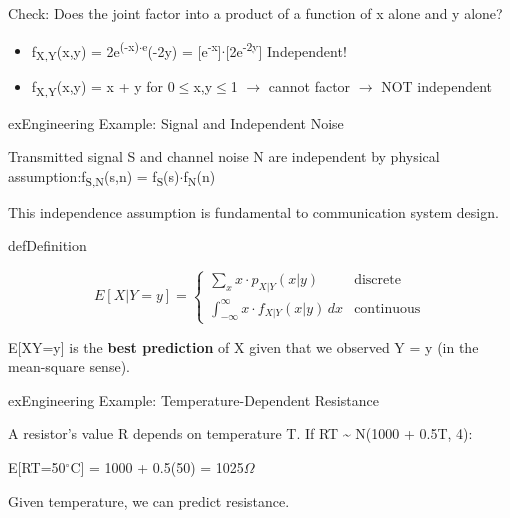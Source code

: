 
Check: Does the joint factor into a product of a function of x alone and y alone?

\begin{itemize}
\tightlist
\item
  f\textsubscript{X,Y}(x,y) = 2e\textsuperscript{(-x)\ensuremath{\cdot}e}(-2y) = [e\textsuperscript{-x}]\ensuremath{\cdot}[2e\textsuperscript{-2y}] \PSyes{} Independent!
\item
  f\textsubscript{X,Y}(x,y) = x + y for 0\ensuremath{\le}x,y\ensuremath{\le}1 \ensuremath{\to} cannot factor \ensuremath{\to} NOT independent
\end{itemize}

\begin{PSbox}[unbreakable]{ex}{Engineering Example: Signal and Independent Noise}

Transmitted signal S and channel noise N are independent by physical assumption:\PSbr{}f\textsubscript{S,N}(s,n) = f\textsubscript{S}(s)\ensuremath{\cdot}f\textsubscript{N}(n)

This independence assumption is fundamental to communication system design.

\end{PSbox}


\begin{PSbox}[unbreakable]{def}{Definition}

\[E[X|Y=y] = \begin{cases} \sum_x x \cdot p_{X|Y}(x|y) & \text{discrete} \\ \int_{-\infty}^{\infty} x \cdot f_{X|Y}(x|y) \, dx & \text{continuous} \end{cases}\]

\end{PSbox}


E[X\textbar{}Y=y] is the \textbf{best prediction} of X given that we observed Y = y (in the mean-square sense).

\begin{PSbox}[unbreakable]{ex}{Engineering Example: Temperature-Dependent Resistance}

A resistor’s value R depends on temperature T. If R\textbar{}T \textasciitilde{} N(1000 + 0.5T, 4):

E[R\textbar{}T=50\ensuremath{^{\circ}}C] = 1000 + 0.5(50) = 1025\ensuremath{\Omega}

Given temperature, we can predict resistance.

\end{PSbox}

